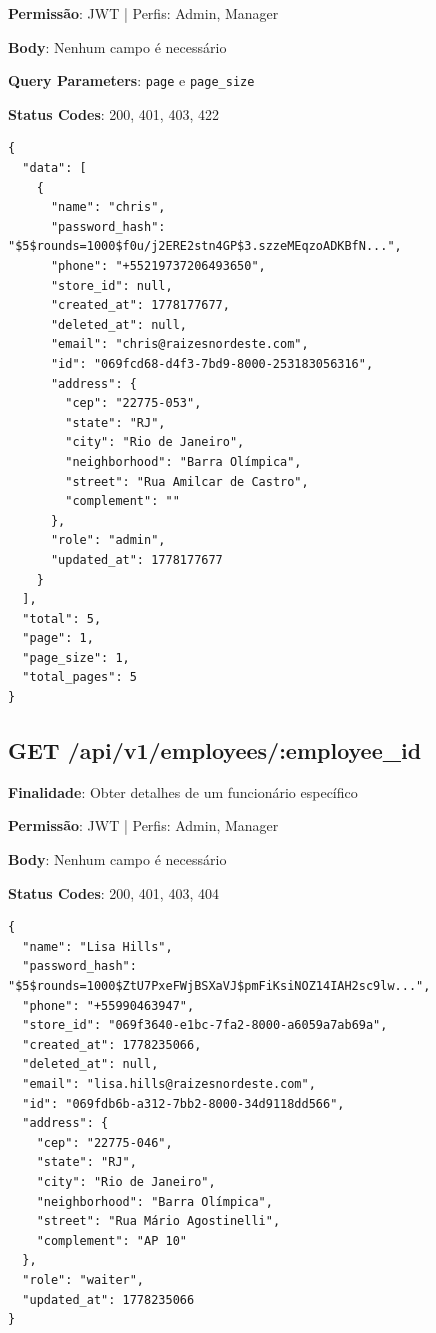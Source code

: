 \noindent\textbf{Permissão}: JWT | Perfis: Admin, Manager

\noindent\textbf{Body}: Nenhum campo é necessário

\noindent\textbf{Query Parameters}: \texttt{page} e \texttt{page\_size}

\noindent\textbf{Status Codes}: 200, 401, 403, 422

\begin{tcolorbox}[colback=green!5, colframe=black, title=\textbf{200 OK}]
\begin{verbatim}
{
  "data": [
    {
      "name": "chris",
      "password_hash": "$5$rounds=1000$f0u/j2ERE2stn4GP$3.szzeMEqzoADKBfN...",
      "phone": "+55219737206493650",
      "store_id": null,
      "created_at": 1778177677,
      "deleted_at": null,
      "email": "chris@raizesnordeste.com",
      "id": "069fcd68-d4f3-7bd9-8000-253183056316",
      "address": {
        "cep": "22775-053",
        "state": "RJ",
        "city": "Rio de Janeiro",
        "neighborhood": "Barra Olímpica",
        "street": "Rua Amilcar de Castro",
        "complement": ""
      },
      "role": "admin",
      "updated_at": 1778177677
    }
  ],
  "total": 5,
  "page": 1,
  "page_size": 1,
  "total_pages": 5
}
\end{verbatim}
\end{tcolorbox}

\subsection{GET /api/v1/employees/:employee\_id}

\noindent\textbf{Finalidade}: Obter detalhes de um funcionário específico

\noindent\textbf{Permissão}: JWT | Perfis: Admin, Manager

\noindent\textbf{Body}: Nenhum campo é necessário

\noindent\textbf{Status Codes}: 200, 401, 403, 404

\begin{tcolorbox}[colback=green!5, colframe=black, title=\textbf{200 OK}]
\begin{verbatim}
{
  "name": "Lisa Hills",
  "password_hash": "$5$rounds=1000$ZtU7PxeFWjBSXaVJ$pmFiKsiNOZ14IAH2sc9lw...",
  "phone": "+55990463947",
  "store_id": "069f3640-e1bc-7fa2-8000-a6059a7ab69a",
  "created_at": 1778235066,
  "deleted_at": null,
  "email": "lisa.hills@raizesnordeste.com",
  "id": "069fdb6b-a312-7bb2-8000-34d9118dd566",
  "address": {
    "cep": "22775-046",
    "state": "RJ",
    "city": "Rio de Janeiro",
    "neighborhood": "Barra Olímpica",
    "street": "Rua Mário Agostinelli",
    "complement": "AP 10"
  },
  "role": "waiter",
  "updated_at": 1778235066
}
\end{verbatim}
\end{tcolorbox}

